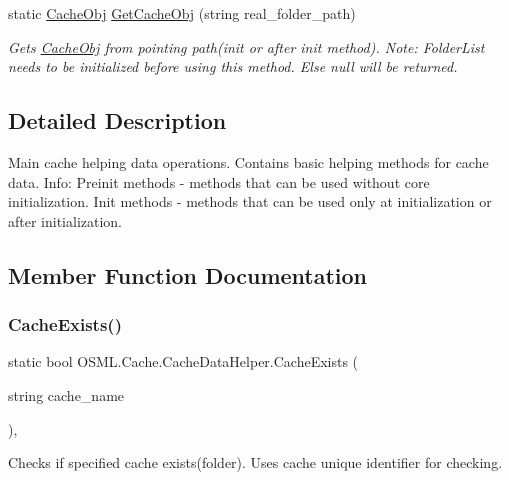 \begin{DoxyCompactItemize}
static \mbox{\hyperlink{classOSML_1_1Cache_1_1CacheObj}{Cache\+Obj}} \mbox{\hyperlink{classOSML_1_1Cache_1_1CacheDataHelper_a3307f454b4daa9701f76200c5e082a88}{Get\+Cache\+Obj}} (string real\+\_\+folder\+\_\+path)
\begin{DoxyCompactList}\small\item\em Gets \mbox{\hyperlink{classOSML_1_1Cache_1_1CacheObj}{Cache\+Obj}} from pointing path(init or after init method). Note\+: Folder\+List needs to be initialized before using this method. Else null will be returned. \end{DoxyCompactList}\end{DoxyCompactItemize}


\subsection{Detailed Description}
Main cache helping data operations. Contains basic helping methods for cache data. Info\+: Preinit methods -\/ methods that can be used without core initialization. Init methods -\/ methods that can be used only at initialization or after initialization. 



\subsection{Member Function Documentation}
\mbox{\label{classOSML_1_1Cache_1_1CacheDataHelper_ad34c09c5cc41a7a3abf1e8ae52536059}} 
\subsubsection{\texorpdfstring{CacheExists()}{CacheExists()}}
{\footnotesize\ttfamily static bool O\+S\+M\+L.\+Cache.\+Cache\+Data\+Helper.\+Cache\+Exists (\begin{DoxyParamCaption}\item[{string}]{cache\+\_\+name }\end{DoxyParamCaption})\hspace{0.3cm}{\ttfamily [inline]}, {\ttfamily [static]}}



Checks if specified cache exists(folder). Uses cache unique identifier for checking. 

